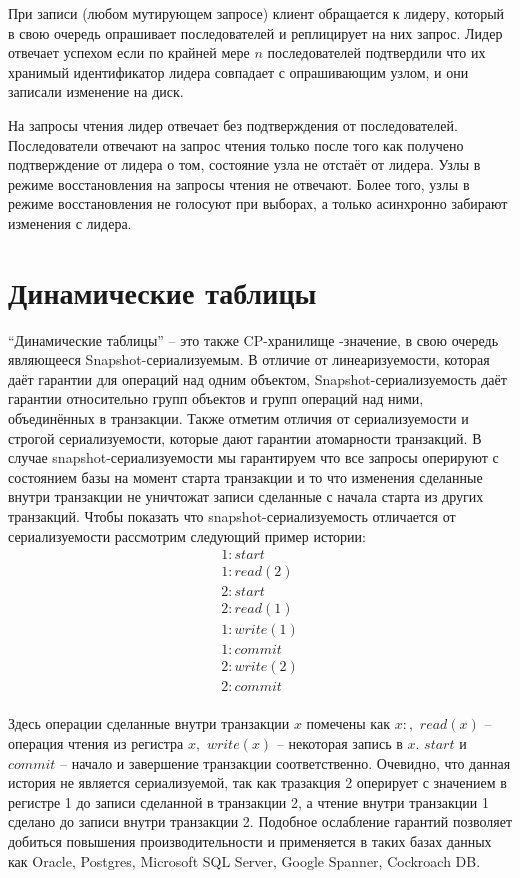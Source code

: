 \documentclass[pdftex,ptm,14pt,a4paper]{extreport}
\theoremstyle{definition}
\begin{document}
При записи (любом мутирующем запросе) клиент обращается к лидеру, который в свою очередь опрашивает последователей и
реплицирует на них запрос. Лидер отвечает успехом если по крайней мере $n$ последователей подтвердили что их хранимый идентификатор
лидера совпадает с опрашивающим узлом, и они записали изменение на диск.

На запросы чтения лидер отвечает без подтверждения от последователей.
Последователи отвечают на запрос чтения только после того как получено подтверждение от лидера о том, состояние узла не отстаёт от лидера.
Узлы в режиме восстановления на запросы чтения не отвечают. Более того, узлы в режиме восстановления не голосуют при выборах, а только
асинхронно забирают изменения с лидера.

\section{Динамические таблицы}
“Динамические таблицы” -- это также CP-хранилище
-значение\guillemotright,
в свою очередь являющееся Snapshot-сериализуемым\cite{snapshot-serializable}.
В отличие от линеаризуемости, которая даёт гарантии для операций над одним объектом,
Snapshot-сериализуемость даёт гарантии относительно групп объектов и групп операций над ними,
объединённых в транзакции.
Также отметим отличия от сериализуемости и строгой сериализуемости, которые дают гарантии атомарности
транзакций. В случае snapshot-сериализуемости мы гарантируем что все запросы оперируют с состоянием базы
на момент старта транзакции и то что изменения сделанные внутри транзакции не уничтожат
записи сделанные с начала старта из других транзакций.
Чтобы показать что snapshot-сериализуемость отличается от сериализуемости рассмотрим следующий пример истории:
\begin{gather*}
1:start \\
1:read(2) \\
2:start \\
2:read(1) \\
1:write(1) \\
1:commit \\
2:write(2) \\
2:commit \\
\end{gather*}

Здесь операции сделанные внутри транзакции $x$ помечены как $x:,$ $read(x)$ -- операция чтения из регистра $x,$
$write(x)$ -- некоторая запись в $x.$ $start$ и $commit$ -- начало и завершение транзакции соответственно.
Очевидно, что данная история не является сериализуемой, так как тразакция 2 оперирует с значением в регистре 1
до записи сделанной в транзакции 2, а чтение внутри транзакции 1 сделано до записи внутри транзакции 2.
Подобное ослабление гарантий позволяет добиться повышения производительности и применяется в таких базах
данных как Oracle, Postgres\cite{postgres}, Microsoft SQL Server, Google Spanner\cite{spanner}, Cockroach DB.
\end{document}
